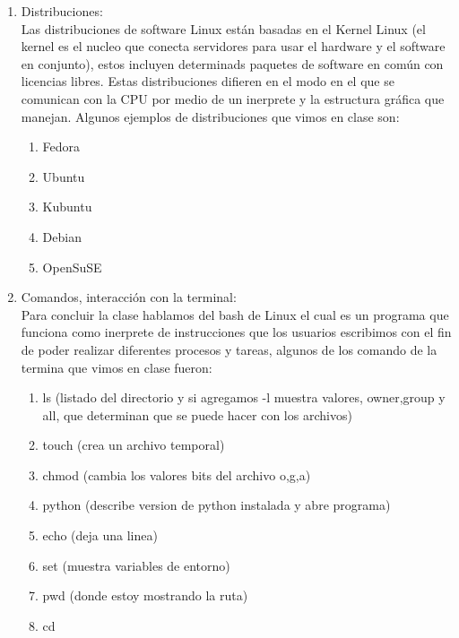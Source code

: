 \documentclass[letterpaper, 12pt, oneside]{article}
\begin{document}
\begin{enumerate}
		\item Distribuciones:\\
		Las distribuciones de software Linux est\'an basadas en el Kernel Linux (el kernel es el nucleo que conecta servidores para usar el hardware y el software en conjunto), estos incluyen determinads paquetes de software en com\'un con licencias libres. Estas distribuciones difieren en el modo en el que se comunican con la CPU por medio de un inerprete y la estructura gr\'afica que manejan. Algunos ejemplos de distribuciones que vimos en clase son:
		\begin{enumerate}
			\item Fedora
			\item Ubuntu
			\item Kubuntu
			\item Debian
			\item OpenSuSE
		\end{enumerate}
	
		\item Comandos, interacci\'on con la terminal:\\
		Para concluir la clase hablamos del bash de Linux el cual es un programa que funciona como inerprete de instrucciones que los usuarios escribimos con el fin de poder realizar diferentes procesos y tareas, algunos de los comando de la termina que vimos en clase fueron:
		\begin{enumerate}
			\item ls	(listado del directorio y si agregamos -l muestra valores, owner,group y all, que determinan que se puede hacer con los archivos)
			\item touch	(crea un archivo temporal)
			\item chmod	(cambia los valores bits del archivo o,g,a)
			\item python	(describe version de python instalada y abre programa)
			\item echo (deja una linea) 
			\item set	(muestra variables de entorno)
			\item pwd	(donde estoy mostrando la ruta)
			\item cd
		\end{enumerate}
	\end{enumerate}
\end{document}
